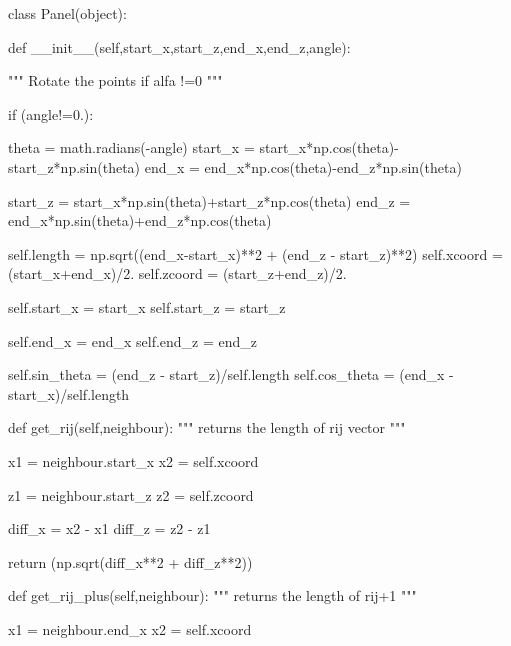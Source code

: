 \documentclass[a4paper,12pt]{article}
\begin{document}
\begin{python}
class Panel(object):

        def __init__(self,start_x,start_z,end_x,end_z,angle):

                """
                Rotate the points if alfa !=0
                """
                
                if (angle!=0.):
                    
                        theta = math.radians(-angle)
                        start_x = start_x*np.cos(theta)-start_z*np.sin(theta)
                        end_x   = end_x*np.cos(theta)-end_z*np.sin(theta)


                        start_z = start_x*np.sin(theta)+start_z*np.cos(theta)
                        end_z = end_x*np.sin(theta)+end_z*np.cos(theta)
                                              
                
                self.length = np.sqrt((end_x-start_x)**2 + (end_z - start_z)**2)
                self.xcoord = (start_x+end_x)/2.
                self.zcoord = (start_z+end_z)/2.

                self.start_x = start_x
                self.start_z = start_z
                
                self.end_x = end_x
                self.end_z = end_z

                self.sin_theta = (end_z - start_z)/self.length
                self.cos_theta = (end_x - start_x)/self.length


        
        def get_rij(self,neighbour):
                """
                returns the length of rij vector
                """

                x1 = neighbour.start_x
                x2 = self.xcoord

                z1 = neighbour.start_z
                z2 = self.zcoord

                diff_x = x2 - x1
                diff_z = z2 - z1
                
                return (np.sqrt(diff_x**2 + diff_z**2))                
                
              
       
        def get_rij_plus(self,neighbour):
                """
                returns the length of rij+1
                """ 

                x1 = neighbour.end_x
                x2 = self.xcoord


\end{python}
\end{document}
